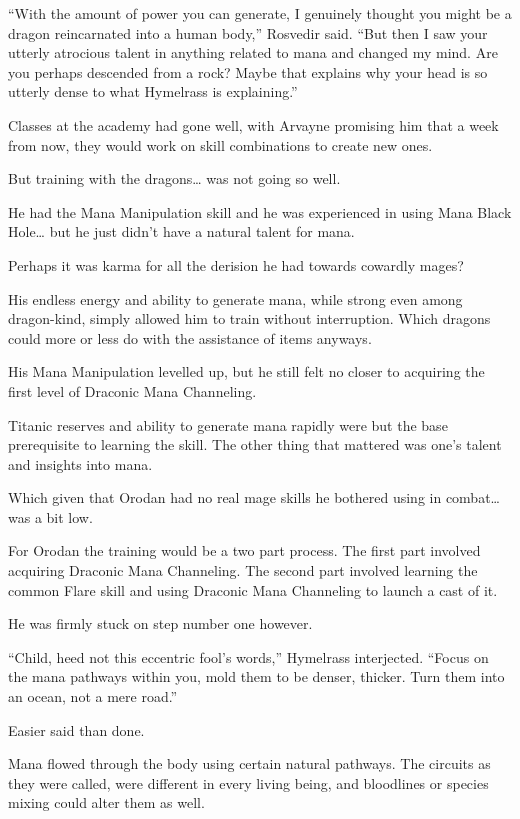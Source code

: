 \documentclass[a4paper,10pt]{book}
\begin{document}
\par
“With the amount of power you can generate, I genuinely thought you might be a dragon reincarnated into a human body,” Rosvedir said. “But then I saw your utterly atrocious talent in anything related to mana and changed my mind. Are you perhaps descended from a rock? Maybe that explains why your head is so utterly dense to what Hymelrass is explaining.”\par
Classes at the academy had gone well, with Arvayne promising him that a week from now, they would work on skill combinations to create new ones.\par
But training with the dragons… was not going so well.\par
He had the Mana Manipulation skill and he was experienced in using Mana Black Hole… but he just didn’t have a natural talent for mana.\par
Perhaps it was karma for all the derision he had towards cowardly mages?\par
His endless energy and ability to generate mana, while strong even among dragon-kind, simply allowed him to train without interruption. Which dragons could more or less do with the assistance of items anyways.\par
His Mana Manipulation levelled up, but he still felt no closer to acquiring the first level of Draconic Mana Channeling.\par
Titanic reserves and ability to generate mana rapidly were but the base prerequisite to learning the skill. The other thing that mattered was one’s talent and insights into mana.\par
Which given that Orodan had no real mage skills he bothered using in combat… was a bit low.\par
For Orodan the training would be a two part process. The first part involved acquiring Draconic Mana Channeling. The second part involved learning the common Flare skill and using Draconic Mana Channeling to launch a cast of it.\par
He was firmly stuck on step number one however.\par
“Child, heed not this eccentric fool’s words,” Hymelrass interjected. “Focus on the mana pathways within you, mold them to be denser, thicker. Turn them into an ocean, not a mere road.”\par
Easier said than done.\par
Mana flowed through the body using certain natural pathways. The circuits as they were called, were different in every living being, and bloodlines or species mixing could alter them as well.\par
\end{document}
